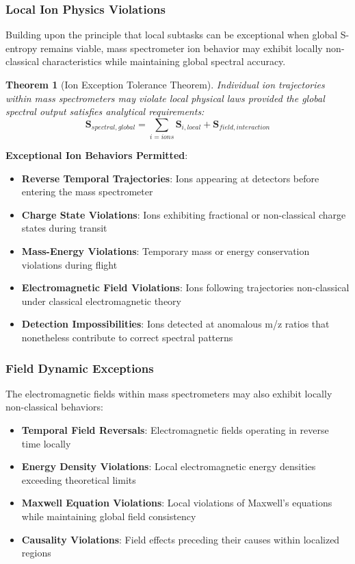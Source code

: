\documentclass[11pt,a4paper]{article}
\newtheorem{theorem}{Theorem}[section]
\theoremstyle{remark}
\begin{document}
\subsubsection{Local Ion Physics Violations}

Building upon the principle that local subtasks can be exceptional when global S-entropy remains viable, mass spectrometer ion behavior may exhibit locally non-classical characteristics while maintaining global spectral accuracy.

\begin{theorem}[Ion Exception Tolerance Theorem]
Individual ion trajectories within mass spectrometers may violate local physical laws provided the global spectral output satisfies analytical requirements:
\begin{equation}
\mathbf{S}_{spectral,global} = \sum_{i=ions} \mathbf{S}_{i,local} + \mathbf{S}_{field,interaction}
\end{equation}
\end{theorem}

\textbf{Exceptional Ion Behaviors Permitted}:
\begin{itemize}
\item \textbf{Reverse Temporal Trajectories}: Ions appearing at detectors before entering the mass spectrometer
\item \textbf{Charge State Violations}: Ions exhibiting fractional or non-classical charge states during transit
\item \textbf{Mass-Energy Violations}: Temporary mass or energy conservation violations during flight
\item \textbf{Electromagnetic Field Violations}: Ions following trajectories non-classical under classical electromagnetic theory
\item \textbf{Detection Impossibilities}: Ions detected at anomalous m/z ratios that nonetheless contribute to correct spectral patterns
\end{itemize}

\subsubsection{Field Dynamic Exceptions}

The electromagnetic fields within mass spectrometers may also exhibit locally non-classical behaviors:

\begin{itemize}
\item \textbf{Temporal Field Reversals}: Electromagnetic fields operating in reverse time locally
\item \textbf{Energy Density Violations}: Local electromagnetic energy densities exceeding theoretical limits
\item \textbf{Maxwell Equation Violations}: Local violations of Maxwell's equations while maintaining global field consistency
\item \textbf{Causality Violations}: Field effects preceding their causes within localized regions
\end{itemize}
\end{document}
